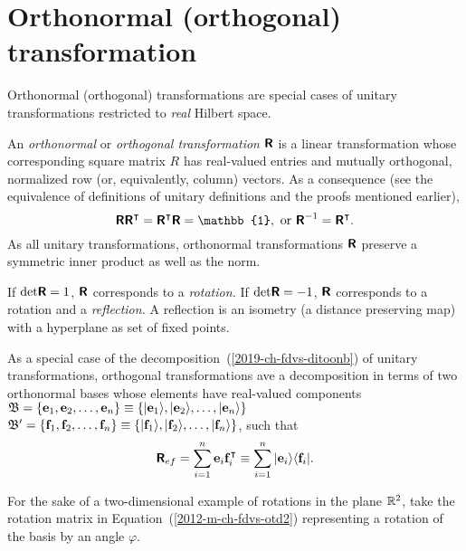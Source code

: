 \section{Orthonormal (orthogonal) transformation}
\label{2015-m-ch-fdlvs-orthproj}

Orthonormal (orthogonal) transformations are special cases of unitary transformations restricted to {\em real} Hilbert space.

An {\em orthonormal} or {\em orthogonal transformation} $\textsf{\textbf{R}}$ is a linear transformation
whose corresponding square matrix $R$ has real-valued entries
and mutually orthogonal, normalized row (or, equivalently, column) vectors.
As a consequence (see the equivalence of definitions of unitary definitions and the proofs mentioned earlier),
\begin{equation}
\textsf{\textbf{R}}\textsf{\textbf{R}}^\intercal = \textsf{\textbf{R}}^\intercal \textsf{\textbf{R}}= \mathbb{1},
\textrm{ or } \textsf{\textbf{R}}^{-1}=\textsf{\textbf{R}}^\intercal  .
\end{equation}
As all unitary transformations, orthonormal transformations $\textsf{\textbf{R}}$
preserve a symmetric inner product as well as the norm.

If $\textrm{det} \textsf{\textbf{R}}=1$, $\textsf{\textbf{R}}$ corresponds to a {\em rotation.}
If $\textrm{det} \textsf{\textbf{R}}=-1$, $\textsf{\textbf{R}}$ corresponds to a rotation and a {\em reflection.}
A reflection is an isometry (a distance preserving map) with a hyperplane as set of fixed points.

As a special case of the decomposition~(\ref{2019-ch-fdvs-ditoonb}) of unitary transformations,
orthogonal transformations ave a decomposition
in terms of two orthonormal bases whose elements have real-valued components
${\frak B}=\{{\bf e}_1,  {\bf e}_2, \ldots , {\bf e}_n\}\equiv \{\vert {\bf e}_1\rangle , \vert  {\bf e}_2\rangle , \ldots , \vert {\bf e}_n\rangle \}$
${\frak B}'=\{{\bf f}_1,  {\bf f}_2, \ldots , {\bf f}_n\}\equiv \{\vert {\bf f}_1\rangle , \vert  {\bf f}_2\rangle , \ldots , \vert {\bf f}_n\rangle \}$,
such that
\begin{equation}
\textsf{\textbf{R}}_{ef}= \sum_{i=1}^n  {\bf e}_i {\bf f}_i^\intercal
\equiv \sum_{i=1}^n  \vert {\bf e}_i\rangle \langle {\bf f}_i \vert
.
\label{2019-ch-fdvs-ditoonbr}
\end{equation}

{\color{blue}
\bexample
For the sake of a two-dimensional  example of rotations in the plane ${\Bbb R}^2$,
take the rotation matrix in Equation~(\ref{2012-m-ch-fdvs-otd2})
representing a rotation of the basis by an angle $\varphi$.

\eexample
}


